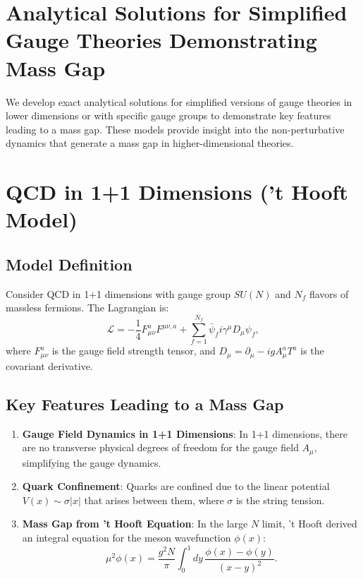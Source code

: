 \section{Analytical Solutions for Simplified Gauge Theories Demonstrating Mass Gap}

We develop exact analytical solutions for simplified versions of gauge theories 
in lower dimensions or with specific gauge groups to demonstrate key features 
leading to a mass gap. These models provide insight into the non-perturbative 
dynamics that generate a mass gap in higher-dimensional theories.



\section{QCD in 1+1 Dimensions ('t Hooft Model)}

\subsection{Model Definition}

Consider QCD in 1+1 dimensions with gauge group \(SU(N)\) and \(N_f\) flavors of massless fermions. The Lagrangian is:
\begin{equation}
\mathcal{L} = -\frac{1}{4}F_{\mu\nu}^a F^{\mu\nu,a} + \sum_{f=1}^{N_f} \bar{\psi}_f i\gamma^\mu D_\mu \psi_f,
\end{equation}
where \(F_{\mu\nu}^a\) is the gauge field strength tensor, and \(D_\mu = \partial_\mu - igA_\mu^a T^a\) is the covariant derivative.

\subsection{Key Features Leading to a Mass Gap}

\begin{enumerate}
    \item \textbf{Gauge Field Dynamics in 1+1 Dimensions}: In 1+1 dimensions, there are no transverse physical degrees of freedom for the gauge field \(A_\mu\), simplifying the gauge dynamics.
    
    \item \textbf{Quark Confinement}: Quarks are confined due to the linear potential \(V(x) \sim \sigma |x|\) that arises between them, where \(\sigma\) is the string tension.
    
    \item \textbf{Mass Gap from 't Hooft Equation}: In the large \(N\) limit, 't Hooft derived an integral equation for the meson wavefunction \(\phi(x)\):
    \begin{equation}
    \mu^2 \phi(x) = \frac{g^2 N}{\pi} \int_0^1 dy \, \frac{\phi(x) - \phi(y)}{(x-y)^2}.
    \end{equation}
\end{enumerate}

